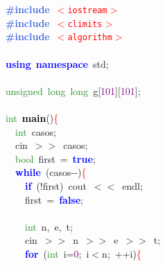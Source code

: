 \noindent
\mbox{}\textbf{\textcolor{RoyalBlue}{\#include}}\ \texttt{\textcolor{Red}{$<$iostream$>$}} \\
\mbox{}\textbf{\textcolor{RoyalBlue}{\#include}}\ \texttt{\textcolor{Red}{$<$climits$>$}} \\
\mbox{}\textbf{\textcolor{RoyalBlue}{\#include}}\ \texttt{\textcolor{Red}{$<$algorithm$>$}} \\
\mbox{} \\
\mbox{}\textbf{\textcolor{Blue}{using}}\ \textbf{\textcolor{Blue}{namespace}}\ std\textcolor{BrickRed}{;} \\
\mbox{} \\
\mbox{}\textcolor{ForestGreen}{unsigned}\ \textcolor{ForestGreen}{long}\ \textcolor{ForestGreen}{long}\ g\textcolor{BrickRed}{[}\textcolor{Purple}{101}\textcolor{BrickRed}{][}\textcolor{Purple}{101}\textcolor{BrickRed}{];} \\
\mbox{} \\
\mbox{}\textcolor{ForestGreen}{int}\ \textbf{\textcolor{Black}{main}}\textcolor{BrickRed}{()}\textcolor{Red}{\{} \\
\mbox{}\ \ \textcolor{ForestGreen}{int}\ casos\textcolor{BrickRed}{;} \\
\mbox{}\ \ cin\ \textcolor{BrickRed}{$>$$>$}\ casos\textcolor{BrickRed}{;} \\
\mbox{}\ \ \textcolor{ForestGreen}{bool}\ first\ \textcolor{BrickRed}{=}\ \textbf{\textcolor{Blue}{true}}\textcolor{BrickRed}{;} \\
\mbox{}\ \ \textbf{\textcolor{Blue}{while}}\ \textcolor{BrickRed}{(}casos\textcolor{BrickRed}{-\/-)}\textcolor{Red}{\{} \\
\mbox{}\ \ \ \ \textbf{\textcolor{Blue}{if}}\ \textcolor{BrickRed}{(!}first\textcolor{BrickRed}{)}\ cout\ \textcolor{BrickRed}{$<$$<$}\ endl\textcolor{BrickRed}{;} \\
\mbox{}\ \ \ \ first\ \textcolor{BrickRed}{=}\ \textbf{\textcolor{Blue}{false}}\textcolor{BrickRed}{;} \\
\mbox{} \\
\mbox{}\ \ \ \ \textcolor{ForestGreen}{int}\ n\textcolor{BrickRed}{,}\ e\textcolor{BrickRed}{,}\ t\textcolor{BrickRed}{;} \\
\mbox{}\ \ \ \ cin\ \textcolor{BrickRed}{$>$$>$}\ n\ \textcolor{BrickRed}{$>$$>$}\ e\ \textcolor{BrickRed}{$>$$>$}\ t\textcolor{BrickRed}{;} \\
\mbox{}\ \ \ \ \textbf{\textcolor{Blue}{for}}\ \textcolor{BrickRed}{(}\textcolor{ForestGreen}{int}\ i\textcolor{BrickRed}{=}\textcolor{Purple}{0}\textcolor{BrickRed}{;}\ i\textcolor{BrickRed}{$<$}n\textcolor{BrickRed}{;}\ \textcolor{BrickRed}{++}i\textcolor{BrickRed}{)}\textcolor{Red}{\{} \\
